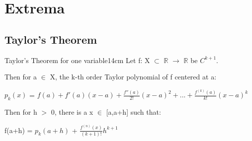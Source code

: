 \newpage

\section[Day 3: Extrema]{ Extrema }

\subsection{ Taylor's Theorem }

    \begin{wtheorem}{Taylor's Theorem for one variable}{14cm}
        Let f: X $\subset$ $\mathbb{R}$ $\rightarrow$ $\mathbb{R}$
        be $C^{k+1}$.
        
        Then for a $\in$ X, the k-th order Taylor polynomial of f centered at a:

        \hspace{0.5cm}
        $p_k(x)$
        = $f(a) + f'(a)(x-a) + \frac{f''(a)}{2!}(x-a)^2
            + ... + \frac{f^{(k)}(a)}{k!}(x-a)^k$

        Then for h $>$ 0, there is a x $\in$ [a,a+h] such that:

        \hspace{0.5cm}
        f(a+h) = $p_k(a+h)$ + $\frac{f^{(n)}(x)}{(k+1)!}h^{k+1}$
    \end{wtheorem}

